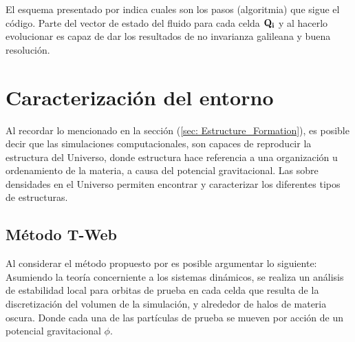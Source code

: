 El esquema presentado por \cite{springel2010} indica cuales son los pasos (algoritmia) que sigue el código. Parte del vector de estado del fluido para cada celda ${\bf{Q_{i}}}$ y al hacerlo evolucionar es capaz de dar los resultados de no invarianza galileana y buena resolución. 

\section{Caracterización del entorno}
\label{sec: Caracterizacion entorno}

Al recordar lo mencionado en la sección (\ref{sec: Estructure_Formation}), es posible decir que las simulaciones computacionales, 
son capaces de reproducir la estructura del Universo, donde estructura hace referencia a una organización u ordenamiento de la materia, a causa del potencial gravitacional. Las sobre densidades en el Universo permiten encontrar y caracterizar los diferentes tipos de estructuras.

    \subsection{Método T-Web}
    \label{subsec: Metodo_T-web}
Al considerar el método propuesto por \cite{hahn2007} es posible argumentar lo siguiente: Asumiendo la teoría concerniente a los sistemas dinámicos, se realiza un análisis de estabilidad local para orbitas de prueba en cada celda que resulta de la discretización del volumen de la simulación, y alrededor de halos de materia oscura. Donde cada una de las partículas de prueba se mueven por acción de un potencial gravitacional $\phi$.

